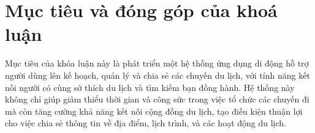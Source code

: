 \section{Mục tiêu và đóng góp của khoá luận}

Mục tiêu của khóa luận này là phát triển một hệ thống ứng dụng di động hỗ trợ người dùng lên kế hoạch, quản lý và chia sẻ các chuyến du lịch, với tính năng kết nối người có cùng sở thích du lịch và tìm kiếm bạn đồng hành. Hệ thống này không chỉ giúp giảm thiểu thời gian và công sức trong việc tổ chức các chuyến đi mà còn tăng cường khả năng kết nối cộng đồng du lịch, tạo điều kiện thuận lợi cho việc chia sẻ thông tin về địa điểm, lịch trình, và các hoạt động du lịch.
